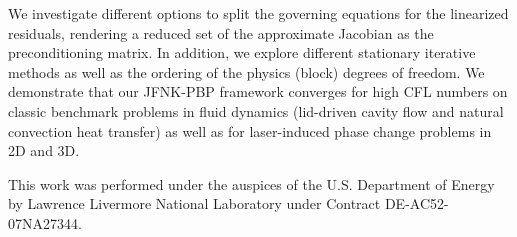 \documentclass{report}
\begin{document}
We investigate different options to split the governing equations for the
linearized residuals, rendering a reduced set of the approximate Jacobian
as the preconditioning matrix. In addition, we explore different
stationary iterative methods as well as the ordering of the physics
(block) degrees of freedom. We demonstrate that our JFNK-PBP framework
converges for high CFL numbers on classic benchmark problems in fluid
dynamics (lid-driven cavity flow and natural convection heat transfer) as
well as for laser-induced phase change problems in 2D and 3D.


This work was performed under the auspices of the U.S. Department of
Energy by Lawrence Livermore National Laboratory under Contract
DE-AC52-07NA27344.
\end{document}
